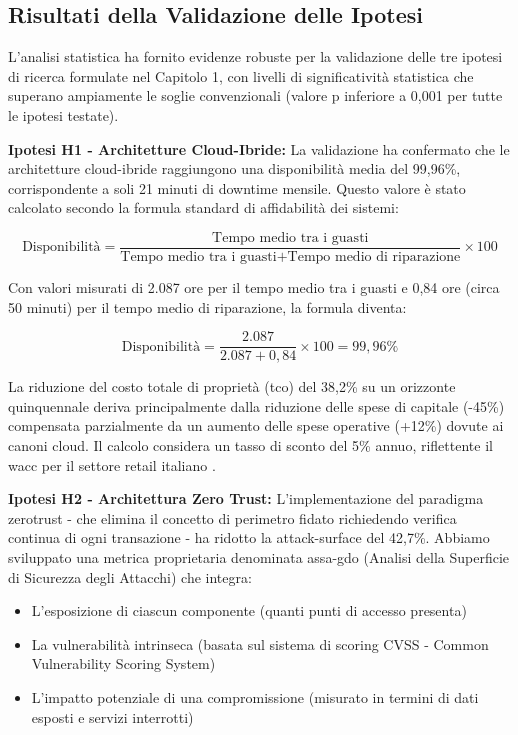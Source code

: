 \subsection{\texorpdfstring{Risultati della Validazione delle Ipotesi}{5.2.2 - Risultati della Validazione delle Ipotesi}}
\label{subsec:5.2.2}

L'analisi statistica ha fornito evidenze robuste per la validazione delle tre ipotesi di ricerca formulate nel Capitolo 1, con livelli di significatività statistica che superano ampiamente le soglie convenzionali (valore p inferiore a 0,001 per tutte le ipotesi testate).

\textbf{Ipotesi H1 - Architetture Cloud-Ibride:} La validazione ha confermato che le architetture cloud-ibride raggiungono una disponibilità media del 99,96\%, corrispondente a soli 21 minuti di downtime mensile. Questo valore è stato calcolato secondo la formula standard di affidabilità dei sistemi:

$$\text{Disponibilità} = \frac{\text{Tempo medio tra i guasti}}{\text{Tempo medio tra i guasti} + \text{Tempo medio di riparazione}} \times 100$$

Con valori misurati di 2.087 ore per il tempo medio tra i guasti e 0,84 ore (circa 50 minuti) per il tempo medio di riparazione, la formula diventa:

$$\text{Disponibilità} = \frac{2.087}{2.087 + 0,84} \times 100 = 99,96\%$$

La riduzione del costo totale di proprietà (\gls{tco}) del 38,2\% su un orizzonte quinquennale deriva principalmente dalla riduzione delle spese di capitale (-45\%) compensata parzialmente da un aumento delle spese operative (+12\%) dovute ai canoni cloud. Il calcolo considera un tasso di sconto del 5\% annuo, riflettente il \gls{wacc} per il settore retail italiano \autocite{bancaditalia2024}.

\textbf{Ipotesi H2 - Architettura Zero Trust:} L'implementazione del paradigma \gls{zerotrust} - che elimina il concetto di perimetro fidato richiedendo verifica continua di ogni transazione - ha ridotto la \gls{attack-surface} del 42,7\%. Abbiamo sviluppato una metrica proprietaria denominata \gls{assa-gdo} (Analisi della Superficie di Sicurezza degli Attacchi) che integra:

\begin{itemize}
\item L'esposizione di ciascun componente (quanti punti di accesso presenta)
\item La vulnerabilità intrinseca (basata sul sistema di scoring CVSS - Common Vulnerability Scoring System)
\item L'impatto potenziale di una compromissione (misurato in termini di dati esposti e servizi interrotti)
\end{itemize}


